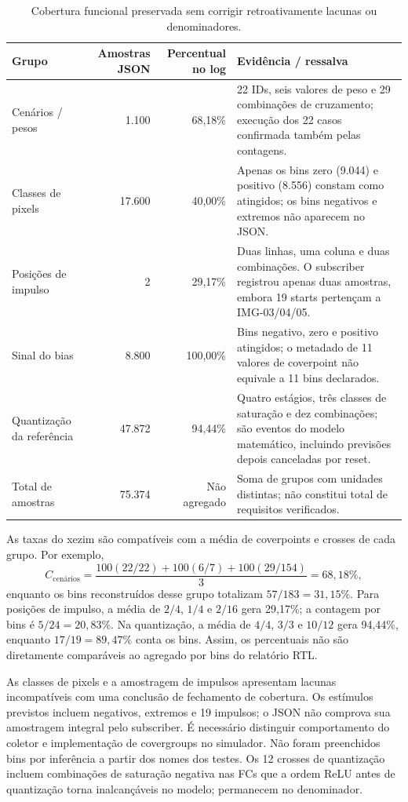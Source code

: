 \documentclass[12pt,a4paper]{article}
\begin{document}
\begin{table}[H]\centering\small
\begin{tabularx}{\textwidth}{p{5.3cm}r r X}\toprule
\textbf{Grupo} & \textbf{Amostras JSON} & \textbf{Percentual no log} & \textbf{Evidência / ressalva}\\\midrule
Cenários / pesos & 1.100 & 68,18\% & 22 IDs, seis valores de peso e 29 combinações de cruzamento; execução dos 22 casos confirmada também pelas contagens.\\
Classes de pixels & 17.600 & 40,00\% & Apenas os bins zero (9.044) e positivo (8.556) constam como atingidos; os bins negativos e extremos não aparecem no JSON.\\
Posições de impulso & 2 & 29,17\% & Duas linhas, uma coluna e duas combinações. O subscriber registrou apenas duas amostras, embora 19 starts pertençam a IMG-03/04/05.\\
Sinal do bias & 8.800 & 100,00\% & Bins negativo, zero e positivo atingidos; o metadado de 11 valores de coverpoint não equivale a 11 bins declarados.\\
Quantização da referência & 47.872 & 94,44\% & Quatro estágios, três classes de saturação e dez combinações; são eventos do modelo matemático, incluindo previsões depois canceladas por reset.\\\midrule
Total de amostras & 75.374 & Não agregado & Soma de grupos com unidades distintas; não constitui total de requisitos verificados.\\\bottomrule
\end{tabularx}
\caption{Cobertura funcional preservada sem corrigir retroativamente lacunas ou denominadores.}
\end{table}

As taxas do xezim são compatíveis com a média de coverpoints e crosses de cada grupo. Por exemplo,
\[
C_{\mathrm{cenários}}=\frac{100(22/22)+100(6/7)+100(29/154)}{3}=68,18\%,
\]
enquanto os bins reconstruídos desse grupo totalizam $57/183=31,15\%$. Para posições de impulso, a média de $2/4$, $1/4$ e $2/16$ gera 29,17\%; a contagem por bins é $5/24=20,83\%$. Na quantização, a média de $4/4$, $3/3$ e $10/12$ gera 94,44\%, enquanto $17/19=89,47\%$ conta os bins. Assim, os percentuais não são diretamente comparáveis ao agregado por bins do relatório RTL.

As classes de pixels e a amostragem de impulsos apresentam lacunas incompatíveis com uma conclusão de fechamento de cobertura. Os estímulos previstos incluem negativos, extremos e 19 impulsos; o JSON não comprova sua amostragem integral pelo subscriber. É necessário distinguir comportamento do coletor e implementação de covergroups no simulador. Não foram preenchidos bins por inferência a partir dos nomes dos testes. Os 12 crosses de quantização incluem combinações de saturação negativa nas FCs que a ordem ReLU antes de quantização torna inalcançáveis no modelo; permanecem no denominador.
\end{document}
